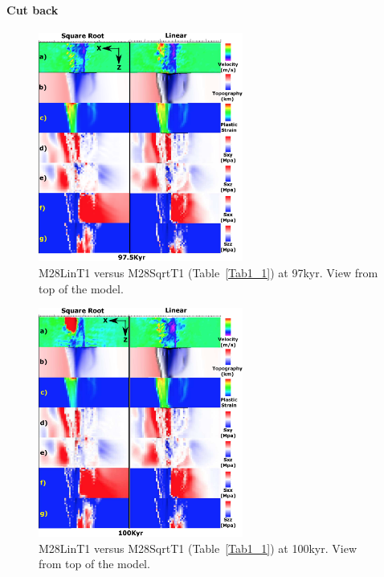 \paragraph{Cut back}\label{para_CutBack}

\begin{figure}[h]
  \centering
    \includegraphics[width=0.6\textwidth]{./Figures/fig_Results4_3_sqrt_vs_lin_cut_back_97kyr.eps}
  \caption{M28LinT1 versus M28SqrtT1 (Table~\hyperref[Tab1_1]{\ref{Tab1_1}}) at 97kyr. View from top of the model.}
 \label{fig_Results4_3_1}
\end{figure}  

\begin{figure}[h]
  \centering
    \includegraphics[width=0.6\textwidth]{./Figures/fig_Results4_3_sqrt_vs_lin_cut_back_100kyr.eps}
  \caption{M28LinT1 versus M28SqrtT1 (Table~\hyperref[Tab1_1]{\ref{Tab1_1}}) at 100kyr. View from top of the model.}
 \label{fig_Results4_3_2}
\end{figure} 

